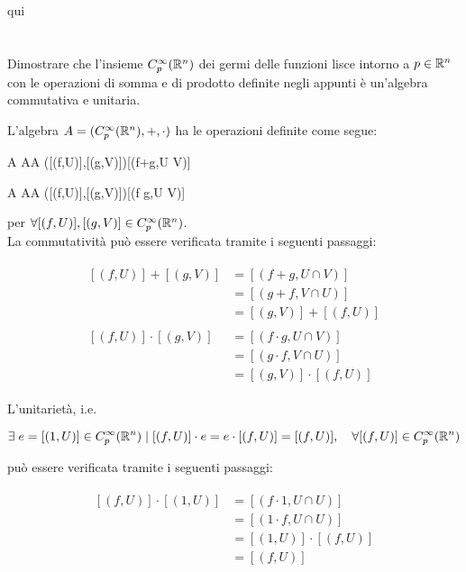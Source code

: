 qui

\tocless\section{}\label{es1-7}

\begin{tcolorbox}
	Dimostrare che l'insieme $ C_{p}^{\infty}(\mathbb{R}^{n}) $ dei germi delle funzioni lisce intorno a $ p \in \mathbb{R}^{n} $ con le operazioni di somma e di prodotto definite negli appunti è un'algebra commutativa e unitaria.
\end{tcolorbox}

L'algebra $ A = (C_{p}^{\infty}(\mathbb{R}^{n}),+,\cdot) $ ha le operazioni definite come segue:

\map{+}%
	{A \times A}{A}%
	{([(f,U)],[(g,V)])}{[(f+g,U \cap V)]}
	
\map{\cdot}%
	{A \times A}{A}%
	{([(f,U)],[(g,V)])}{[(f g,U \cap V)]}
	
per $ \forall [(f,U)],[(g,V)] \in C_{p}^{\infty}(\mathbb{R}^{n}) $.\\
La commutatività può essere verificata tramite i seguenti passaggi:

\begin{align}
	\begin{split}
		[(f,U)] + [(g,V)] &= [(f+g,U \cap V)]\\
		&= [(g+f,V \cap U)]\\
		&= [(g,V)] + [(f,U)]\\\\
		[(f,U)] \cdot [(g,V)] &= [(f \cdot g,U \cap V)]\\
		&= [(g \cdot f,V \cap U)]\\
		&= [(g,V)] \cdot [(f,U)]
	\end{split}
\end{align}

L'unitarietà, i.e.

\begin{equation}
	\E e = [(1,U)] \in C_{p}^{\infty}(\R^{n}) \mid [(f,U)] \cdot e = e \cdot [(f,U)] = [(f,U)] \qcomma \forall [(f,U)] \in C_{p}^{\infty}(\R^{n})
\end{equation}

può essere verificata tramite i seguenti passaggi:

\begin{align}
	\begin{split}
		[(f,U)] \cdot [(1,U)] &= [(f \cdot 1,U \cap U)]\\
		&= [(1 \cdot f,U \cap U)]\\
		&= [(1,U)] \cdot [(f,U)]\\
		&= [(f,U)]
	\end{split}
\end{align}

